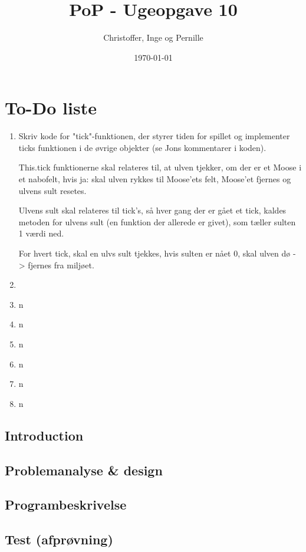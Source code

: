 \documentclass[a4paper]{report}
\title{PoP - Ugeopgave 10}
\author{Christoffer, Inge og Pernille}
\date{\today}
\begin{document}
\maketitle

\section*{To-Do liste}

\begin{enumerate}

\item Skriv kode for "tick"-funktionen, der styrer tiden for spillet og implementer ticks funktionen i de øvrige objekter (se Jons kommentarer i koden).

This.tick funktionerne skal relateres til, at ulven tjekker, om der er et Moose i et nabofelt, hvis ja: skal ulven rykkes til Moose'ets felt, Moose'et fjernes og ulvens sult resetes.

Ulvens sult skal relateres til tick's, så hver gang der er gået et tick, kaldes metoden for ulvens sult (en funktion der allerede er givet), som tæller sulten 1 værdi ned.

For hvert tick, skal en ulvs sult tjekkes, hvis sulten er nået 0, skal ulven dø -> fjernes fra miljøet.
\item 
\item n
\item n
\item n
\item n
\item n
\item n

\end{enumerate}

\newpage

\subsection*{Introduction}

\subsection*{Problemanalyse \& design}

\subsection*{Programbeskrivelse}

\subsection*{Test (afprøvning)}
\end{document}
